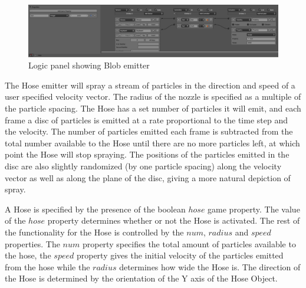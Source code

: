 \begin{figure}[!htc]
 		\centering
		\includegraphics[scale=0.22]{figures/ui_emitter.png}
        \caption{ Logic panel showing Blob emitter }
		\label{fig:ui_emitter}
\end{figure}



The Hose emitter will spray a stream of particles in the direction and speed of
a user specified velocity vector. The radius of the nozzle is specified as a
multiple of the particle spacing. The Hose has a set number of particles it
will emit, and each frame a disc of particles is emitted at a rate proportional
to the time step and the velocity. The number of particles emitted each frame
is subtracted from the total number available to the Hose until there are no
more particles left, at which point the Hose will stop spraying. The positions
of the particles emitted in the disc are also slightly randomized (by one
particle spacing) along the velocity vector as well as along the plane of the
disc, giving a more natural depiction of spray.

A Hose is specified by the presence of the boolean $hose$ game property. The
value of the $hose$ property determines whether or not the Hose is activated.
The rest of the functionality for the Hose is controlled by the $num$, $radius$
and $speed$ properties. The $num$ property specifies the total amount of
particles available to the hose, the $speed$ property gives the initial
velocity of the particles emitted from the hose while the $radius$ determines
how wide the Hose is. The direction of the Hose is determined by the
orientation of the Y axis of the Hose Object.


